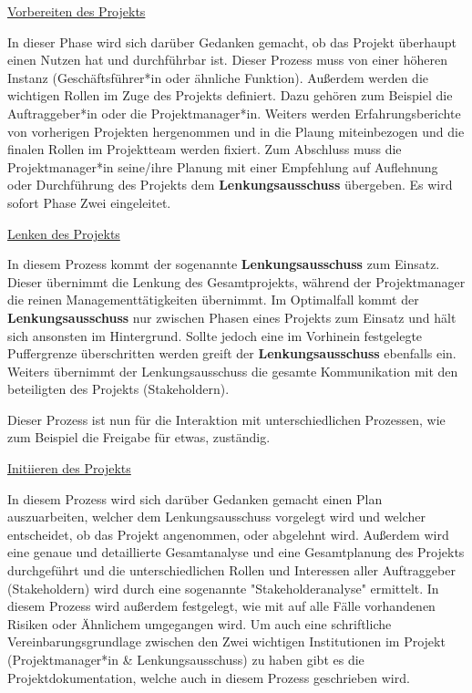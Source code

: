 \underline{Vorbereiten des Projekts}

In dieser Phase wird sich darüber Gedanken gemacht, ob das Projekt überhaupt einen Nutzen hat und durchführbar ist. Dieser Prozess muss von einer höheren Instanz (Geschäftsführer*in oder ähnliche Funktion). Außerdem werden die wichtigen Rollen im Zuge des Projekts definiert. Dazu gehören zum Beispiel die Auftraggeber*in oder die Projektmanager*in. Weiters werden Erfahrungsberichte von vorherigen Projekten hergenommen und in die Plaung miteinbezogen und die finalen Rollen im Projektteam werden fixiert. Zum Abschluss muss die Projektmanager*in seine/ihre Planung mit einer Empfehlung auf Auflehnung oder Durchführung des Projekts dem \textbf{Lenkungsausschuss} übergeben. Es wird sofort Phase Zwei eingeleitet. \cite{Prince2}

\pagebreak
\underline{Lenken des Projekts}

In diesem Prozess kommt der sogenannte \textbf{Lenkungsausschuss} zum Einsatz. Dieser übernimmt die Lenkung des Gesamtprojekts, während der Projektmanager die reinen Managementtätigkeiten übernimmt. Im Optimalfall kommt der \textbf{Lenkungsausschuss} nur zwischen Phasen eines Projekts zum Einsatz und hält sich ansonsten im Hintergrund. Sollte jedoch eine im Vorhinein festgelegte Puffergrenze überschritten werden greift der \textbf{Lenkungsausschuss} ebenfalls ein. Weiters übernimmt der Lenkungsausschuss die gesamte Kommunikation mit den beteiligten des Projekts (Stakeholdern).

Dieser Prozess ist nun für die Interaktion mit unterschiedlichen Prozessen, wie zum Beispiel die Freigabe für etwas, zuständig. \cite{Prince2}

\underline{Initiieren des Projekts}

In diesem Prozess wird sich darüber Gedanken gemacht einen Plan auszuarbeiten, welcher dem Lenkungsausschuss vorgelegt wird und welcher entscheidet, ob das Projekt angenommen, oder abgelehnt wird. Außerdem wird eine genaue und detaillierte Gesamtanalyse und eine Gesamtplanung des Projekts durchgeführt und die unterschiedlichen Rollen und Interessen aller Auftraggeber (Stakeholdern) wird durch eine sogenannte "Stakeholderanalyse" ermittelt. In diesem Prozess wird außerdem festgelegt, wie mit auf alle Fälle vorhandenen Risiken oder Ähnlichem umgegangen wird. Um auch eine schriftliche Vereinbarungsgrundlage zwischen den Zwei wichtigen Institutionen im Projekt (Projektmanager*in \& Lenkungsausschuss) zu haben gibt es die Projektdokumentation, welche auch in diesem Prozess geschrieben wird.

